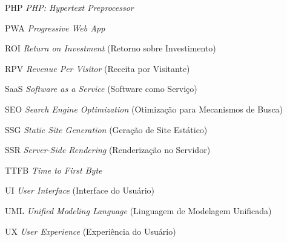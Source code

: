 \documentclass[
	12pt,				%
	twoside,			%
	a4paper,			%
	english,			%
	french,				%
	spanish,			%
	brazil				%
	]{abntex2}
\begin{document}
\begin{siglas}
  \item[PHP] \textit{PHP: Hypertext Preprocessor}
  \item[PWA] \textit{Progressive Web App}
  \item[ROI] \textit{Return on Investment} (Retorno sobre Investimento)
  \item[RPV] \textit{Revenue Per Visitor} (Receita por Visitante)
  \item[SaaS] \textit{Software as a Service} (Software como Serviço)
  \item[SEO] \textit{Search Engine Optimization} (Otimização para Mecanismos de Busca)
  \item[SSG] \textit{Static Site Generation} (Geração de Site Estático)
  \item[SSR] \textit{Server-Side Rendering} (Renderização no Servidor)
  \item[TTFB] \textit{Time to First Byte}
  \item[UI] \textit{User Interface} (Interface do Usuário)
  \item[UML] \textit{Unified Modeling Language} (Linguagem de Modelagem Unificada)
  \item[UX] \textit{User Experience} (Experiência do Usuário)
\end{siglas}

\tableofcontents*
\clearpage

\textual








\postextual



%
%
\end{document}
